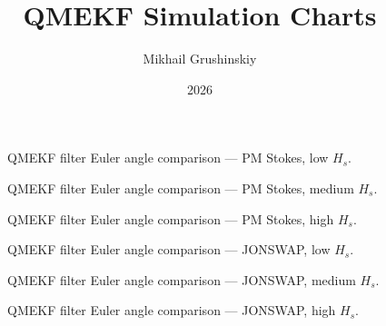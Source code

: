\documentclass[11pt,letterpaper]{article}
\title{QMEKF Simulation Charts}
\author{Mikhail Grushinskiy}
\date{2026}
\begin{document}
    \maketitle



    \begin{figure}[H]\centering
    \resizebox{\textwidth}{!}{}
    \caption{QMEKF filter Euler angle comparison — PM Stokes, low $H_s$.}
    \label{fig:qmekf_pmstokes_low}
    \end{figure}

    \begin{figure}[H]\centering
    \resizebox{\textwidth}{!}{}
    \caption{QMEKF filter Euler angle comparison — PM Stokes, medium $H_s$.}
    \label{fig:qmekf_pmstokes_medium}
    \end{figure}

    \begin{figure}[H]\centering
    \resizebox{\textwidth}{!}{}
    \caption{QMEKF filter Euler angle comparison — PM Stokes, high $H_s$.}
    \label{fig:qmekf_pmstokes_high}
    \end{figure}

    \begin{figure}[H]\centering
    \resizebox{\textwidth}{!}{}
    \caption{QMEKF filter Euler angle comparison — JONSWAP, low $H_s$.}
    \label{fig:qmekf_jonswap_low}
    \end{figure}

    \begin{figure}[H]\centering
    \resizebox{\textwidth}{!}{}
    \caption{QMEKF filter Euler angle comparison — JONSWAP, medium $H_s$.}
    \label{fig:qmekf_jonswap_medium}
    \end{figure}

    \begin{figure}[H]\centering
    \resizebox{\textwidth}{!}{}
    \caption{QMEKF filter Euler angle comparison — JONSWAP, high $H_s$.}
    \label{fig:qmekf_jonswap_high}
    \end{figure}
\end{document}
